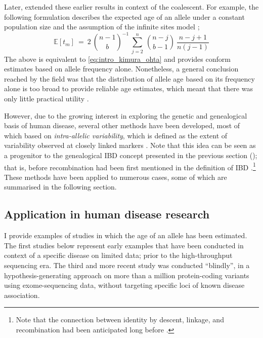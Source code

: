 Later, \citet{Griffiths:2013ec} extended these earlier results in context of the coalescent.
For example, the following formulation describes the expected age of an allele under a constant population size and the assumption of the infinite sites model \citep{Kimura:1969tn,Watterson:1975ur};
\begin{equation}\label{eq:intro_griffiths_tavare}
	\mathbb{E}\left[t_m\right]~=~2~{{n-1}\choose{b}}^{-1}~\sum_{j=2}^{n}~{{n-j}\choose{b-1}}~\frac{n-j+1}{n(j-1)}
\end{equation}
The above is equivalent to \cref{eq:intro_kimura_ohta} and provides conform estimates based on allele frequency alone.
Nonetheless, a general conclusion reached by the field was that the distribution of allele age based on its frequency alone is too broad to provide reliable age estimates, which meant that there was only little practical utility \citep[see][]{Slatkin:2000bi}.

However, due to the growing interest in exploring the genetic and genealogical basis of human disease, several other methods have been developed, most of which based on \emph{intra-allelic variability}, which is defined as the extent of variability observed at closely linked markers \citep{Slatkin:2000us,Slatkin:2001wr}.
Note that this idea can be seen as a progenitor to the genealogical IBD concept presented in the previous section (); that is, before recombination had been first mentioned in the definition of IBD \citep{Hayes:2003gj}.\footnote{Note that the connection between identity by descent, linkage, and recombination had been anticipated long before \citep[\eg see][]{Donnelly:1983fi}.}
These methods have been applied to numerous cases, some of which are summarised in the following section.


%
\subsection{Application in human disease research}
%

I provide  examples of studies in which the age of an allele has been estimated.
The first  studies below represent early examples that have been conducted in context of a specific disease on limited data; \ie prior to the high-throughput sequencing era.
The third and more recent study was conducted ``blindly'', in a hypothesis-generating approach on more than a million protein-coding variants using exome-sequencing data, without targeting specific loci of known disease association.

